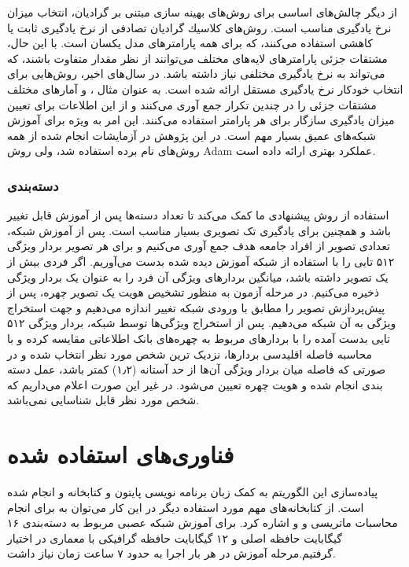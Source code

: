 \noindent
از دیگر چالش‌های اساسی برای روش‌های بهینه سازی مبتنی بر گرادیان، انتخاب میزان نرخ یادگیری مناسب است. روش‌های كلاسیك گرادیان تصادفی از نرخ یادگیری ثابت یا كاهشی استفاده می‌كنند، كه برای همه پارامترهای مدل یكسان است. با این حال، مشتقات جزئی پارامترهای لایه‌های مختلف می‌توانند از نظر مقدار متفاوت باشند، كه می‌تواند به نرخ یادگیری مختلفی نیاز داشته باشد. در سال‌های اخیر، روش‌هایی برای انتخاب خودكار نرخ یادگیری مستقل ارائه شده است. به عنوان مثال
 ، 
و  آمارهای مختلف مشتقات جزئی را در چندین تكرار جمع آوری می‌كنند و از این اطلاعات برای تعیین میزان یادگیری سازگار برای هر پارامتر استفاده می‌كنند. این امر به ویژه برای آموزش شبكه‌های عمیق بسیار مهم است. در این پژوهش در آزمایشات انجام شده از همه روش‌های نام برده استفاده شد، ولی روش Adam عملكرد بهتری ارائه داده است.

\subsubsection{دسته‌بندی}
استفاده از روش پیشنهادی ما کمک می‌کند تا تعداد دسته‌ها پس از آموزش قابل تغییر باشد و همچنین برای یادگیری تک تصویری  بسیار مناسب است. پس از آموزش شبکه، تعدادی تصویر از افراد جامعه هدف جمع آوری می‌کنیم و برای هر تصویر بردار ویژگی ۵۱۲ تایی را با استفاده از شبکه آموزش دیده شده بدست می‌آوریم. اگر فردی بیش از یک تصویر داشته باشد، میانگین بردارهای ویژگی آن فرد را به عنوان یک بردار ویژگی ذخیره ‌می‌کنیم. در مرحله آزمون به منظور تشخیص هویت یک تصویر چهره، پس از پیش‌پردازش تصویر را مطابق با ورودی شبکه تغییر اندازه می‌دهیم و جهت استخراج ویژگی‌ به آن شبکه می‌دهیم. پس از استخراج ویژگی‌ها توسط شبکه، بردار ویژگی ۵۱۲ تایی بدست آمده را با بردارهای مربوط به چهره‌های بانک اطلاعاتی مقایسه کرده و با محاسبه فاصله اقلیدسی بردارها، نزدیک ترین شخص مورد نظر انتخاب شده و در صورتی که فاصله میان بردار ویژگی آن‌ها از حد آستانه (۱٫۲) کمتر باشد، عمل دسته بندی انجام شده و هویت چهره تعیین می‌شود. در غیر این صورت اعلام می‌داریم که شخص مورد نظر قابل شناسایی نمی‌باشد.

\section{فناوری‌های استفاده شده}
پیاده‌سازی این الگوریتم به کمک زبان برنامه‌ نویسی پایتون و کتابخانه  و  انجام شده است. از کتابخانه‌های مهم مورد استفاده دیگر در این کار می‌‌توان به  برای انجام محاسبات ماتریسی و  و  اشاره کرد. برای آموزش شبکه عصبی مربوط به دسته‌بندی ۱۶ گیگابایت حافظه اصلی و ۱۲ گیگابایت حافظه گرافیکی با معماری  در اختیار گرفتیم.مرحله آموزش در هر بار اجرا به حدود ۷ ساعت زمان نیاز داشت.
